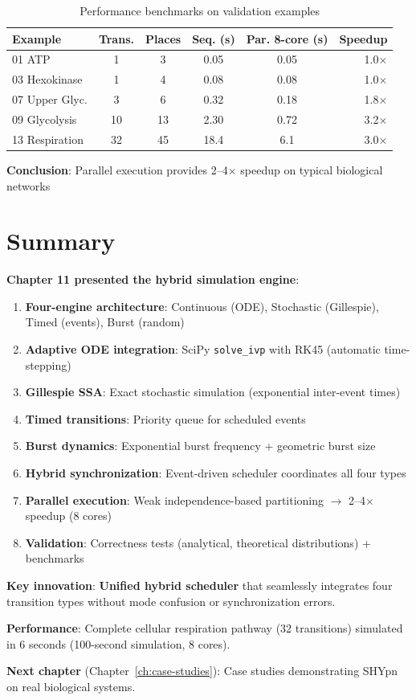 \begin{table}[h]
\centering
\begin{tabular}{@{}lccccr@{}}
\toprule
\textbf{Example} & \textbf{Trans.} & \textbf{Places} & \textbf{Seq. (s)} & \textbf{Par. 8-core (s)} & \textbf{Speedup} \\
\midrule
01 ATP         & 1  & 3  & 0.05  & 0.05 & 1.0$\times$ \\
03 Hexokinase  & 1  & 4  & 0.08  & 0.08 & 1.0$\times$ \\
07 Upper Glyc. & 3  & 6  & 0.32  & 0.18 & 1.8$\times$ \\
09 Glycolysis  & 10 & 13 & 2.30  & 0.72 & 3.2$\times$ \\
13 Respiration & 32 & 45 & 18.4  & 6.1  & 3.0$\times$ \\
\bottomrule
\end{tabular}
\caption{Performance benchmarks on validation examples}
\label{tab:performance-benchmarks}
\end{table}

\textbf{Conclusion}: Parallel execution provides 2--4$\times$ speedup on typical biological networks

\section{Summary}
\label{sec:simulation-summary}

\textbf{Chapter 11 presented the hybrid simulation engine}:

\begin{enumerate}
    \item \textbf{Four-engine architecture}: Continuous (ODE), Stochastic (Gillespie), Timed (events), Burst (random)
    \item \textbf{Adaptive ODE integration}: SciPy \texttt{solve\_ivp} with RK45 (automatic time-stepping)
    \item \textbf{Gillespie SSA}: Exact stochastic simulation (exponential inter-event times)
    \item \textbf{Timed transitions}: Priority queue for scheduled events
    \item \textbf{Burst dynamics}: Exponential burst frequency + geometric burst size
    \item \textbf{Hybrid synchronization}: Event-driven scheduler coordinates all four types
    \item \textbf{Parallel execution}: Weak independence-based partitioning $\to$ 2--4$\times$ speedup (8 cores)
    \item \textbf{Validation}: Correctness tests (analytical, theoretical distributions) + benchmarks
\end{enumerate}

\textbf{Key innovation}: \textbf{Unified hybrid scheduler} that seamlessly integrates four transition types without mode confusion or synchronization errors.

\textbf{Performance}: Complete cellular respiration pathway (32 transitions) simulated in 6 seconds (100-second simulation, 8 cores).

\textbf{Next chapter} (Chapter~\ref{ch:case-studies}): Case studies demonstrating SHYpn on real biological systems.
